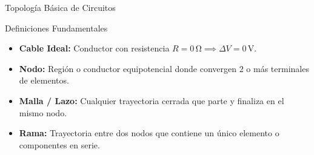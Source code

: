 \documentclass[10pt, aspectratio=169, handout]{beamer}
\begin{document}
\begin{frame}{Topología Básica de Circuitos}
    \begin{boxTeoria}{Definiciones Fundamentales}
        \pause
        \begin{itemize}
            \item<1-> \textbf{Cable Ideal:} Conductor con resistencia $R = 0\,\unit{\ohm} \implies \Delta V = 0\,\mathrm{V}$.
            \item<2-> \textbf{Nodo:} Región o conductor equipotencial donde convergen 2 o más terminales de elementos.
            \item<3-> \textbf{Malla / Lazo:} Cualquier trayectoria cerrada que parte y finaliza en el mismo nodo.
            \item<4-> \textbf{Rama:} Trayectoria entre dos nodos que contiene un único elemento o componentes en serie.
        \end{itemize}
    \end{boxTeoria}

\end{frame}
\end{document}
